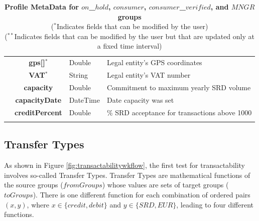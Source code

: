 \begin{table}[H]
\begin{centering}
{\begin{tabular}{ r | c | l | l }
			& {\bf gps[]}$^*$			&Double	& Legal entity's GPS coordinates \\
			& {\bf VAT}$^*$				&String	& Legal entity's VAT number \\
			& {\bf capacity}				&Double	& Commitment to maximum yearly SRD volume \\
			& {\bf capacityDate}			&DateTime & Date capacity was set \\
			& {\bf creditPercent}			&Double	& \% SRD acceptance for transactions above 1000 \\
\Xhline{1.5pt}
\end{tabular}
}
\caption{\small\textbf{Profile MetaData for $on$\_$hold$, $consumer$, $consumer$\_$verified$, and $MNGR$ groups}\\
($^*$Indicates fields that can be modified by the user)\\
($^{**}$Indicates fields that can be modified by the user but that are updated only at a fixed time interval)
}
\label{tab:ProfileMetaData2}
\end{centering}
\vspace{-1cm}
\end{table}

\subsection{Transfer Types}
As shown in Figure \ref{fig:transactabilitywkflow}, the first test for transactability involves so-called Transfer Types. Transfer Types are mathematical functions of the source groups ($fromGroups$) whose values are sets of target groups ($toGroups$). There is one different function for each combination of ordered pairs $(x, y)$, where $x \in \{ credit, debit \}$ and $y \in \{ SRD, EUR \}$, leading to four different functions.


